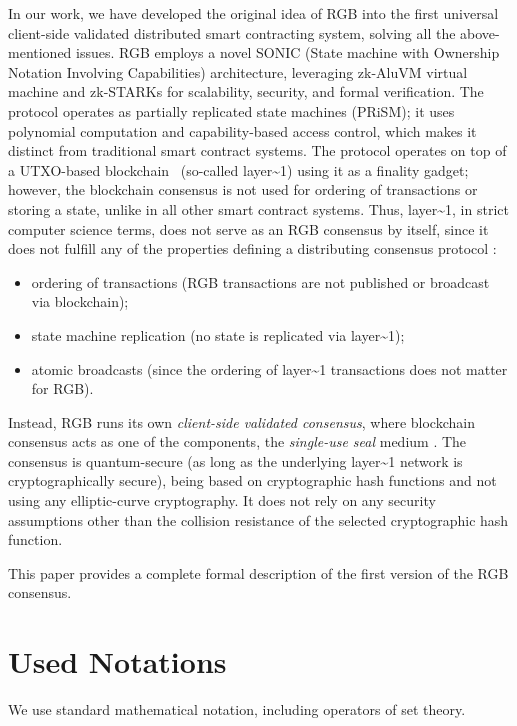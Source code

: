 \documentclass[9pt,oneside]{amsart}
\begin{document}
\begin{multicols}{2}
In our work, we have developed the original idea of RGB into the first universal
client-side validated distributed smart contracting system,
solving all the above-mentioned issues.
RGB employs a novel SONIC (State machine with Ownership Notation Involving Capabilities) architecture,
leveraging zk-AluVM virtual machine \cite{AluVM} and zk-STARKs \cite{zkSTARKs}
for scalability, security, and formal verification.
The protocol operates as partially replicated state machines (PRiSM);
it uses polynomial computation and capability-based access control,
which makes it distinct from traditional smart contract systems.
The protocol operates on top of a UTXO-based blockchain~\cite{UTXO}
(so-called \gls{layer~1}) using it as a finality gadget;
however, the blockchain consensus is not used for ordering of transactions or storing a state,
unlike in all other smart contract systems.
Thus, \gls{layer~1}, in strict computer science terms,
does not serve as an RGB consensus by itself,
since it does not fulfill any of the properties defining
a distributing consensus protocol \cite{consensus}:
\noindent\nopagebreak
\begin{itemize}
    \item ordering of transactions (RGB transactions are not published or broadcast via blockchain);
    \item state machine replication (no state is replicated via \gls{layer~1});
    \item atomic broadcasts (since the ordering of \gls{layer~1} transactions does not matter for RGB).
\end{itemize}

Instead, RGB runs its own \emph{client-side validated consensus}, where blockchain consensus
acts as one of the components, the \emph{single-use seal} medium \cite{LNPBP8}.
The consensus is quantum-secure (as long as the underlying \gls{layer~1} network is cryptographically secure),
being based on cryptographic hash functions and not using any elliptic-curve cryptography.
It does not rely on any security assumptions other than the collision resistance of the selected
cryptographic hash function.

This paper provides a complete formal description of the first version of the RGB consensus.

\section{Used Notations}

We use standard mathematical notation, including operators of set theory.


\end{multicols}
\end{document}
